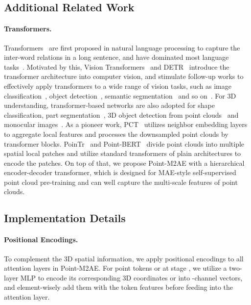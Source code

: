 \documentclass{article}
\begin{document}
\subsection{Additional Related Work}
\paragraph{Transformers.}
Transformers~\cite{vaswani2017attention} are first proposed in natural language processing to capture the inter-word relations in a long sentence, and have dominated most language tasks~\cite{bert,gpt1,gpt2,gpt3}. Motivated by this, Vision Transformers~\cite{vit} and DETR~\cite{carion2020end} introduce the transformer architecture into computer vision, and stimulate follow-up works to effectively apply transformers to a wide range of vision tasks, such as image classification~\cite{touvron2021training,liu2021swin,mao2021dual}, object detection~\cite{zhu2020deformable,zheng2020end,gao2021fast}, semantic segmentation~\cite{xie2021segformer} and so on~\cite{li2022uniformer}. For 3D understanding, transformer-based networks are also adopted for shape classification, part segmentation~\cite{guo2021pct,pointtransformer}, 3D object detection from point clouds~\cite{3detr} and monocular images~\cite{zhang2022monodetr}. As a pioneer work, PCT~\cite{guo2021pct} utilizes neighbor embedding layers to aggregate local features and processes the downsampled point clouds by transformer blocks. PoinTr~\cite{yu2021pointr} and Point-BERT~\cite{pointbert} divide point clouds into multiple spatial local patches and utilize standard transformers of plain architectures to encode the patches. On top of that, we propose Point-M2AE with a hierarchical encoder-decoder transformer, which is designed for MAE-style self-supervised point cloud pre-training and can well capture the multi-scale features of point clouds.

\subsection{Implementation Details}

\paragraph{Positional Encodings.}
To complement the 3D spatial information, we apply positional encodings to all attention layers in Point-M2AE. For point tokens  or  at stage , we utilize a two-layer MLP to encode its corresponding 3D coordinates  or  into -channel vectors, and element-wisely add them with the token features before feeding into the attention layer.
\end{document}
